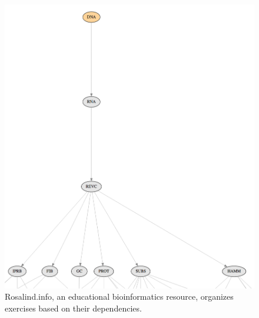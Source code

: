 \documentclass[11pt]{article}
\begin{document}
\begin{figure}[ht!]
        \begin{center}
                \includegraphics[height=0.5\textheight]{rosalind.png}
        \end{center}
        \caption{Rosalind.info, an educational bioinformatics resource, 
        organizes exercises based on their dependencies.}
        \label{fig:rosalind}
\end{figure}
          
\end{document}
